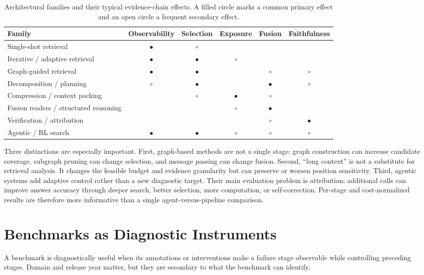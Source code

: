 \documentclass[manuscript,review]{acmart}
\theoremstyle{definition}
\theoremstyle{plain}
\theoremstyle{remark}
\begin{document}
\begin{table}[H]
\caption{Architectural families and their typical evidence-chain effects. A
filled circle marks a common primary effect and an open circle a frequent
secondary effect.}
\label{tab:architecture_estimand}
\centering
\small
\begin{tabularx}{\linewidth}{@{}p{2.7cm}CCCCC@{}}
\toprule
Family & Observability & Selection & Exposure & Fusion & Faithfulness \\
\midrule
Single-shot retrieval & $\bullet$ & $\circ$ &  &  &  \\
Iterative / adaptive retrieval & $\bullet$ & $\bullet$ & $\circ$ &  &  \\
Graph-guided retrieval & $\bullet$ & $\bullet$ &  & $\circ$ & $\circ$ \\
Decomposition / planning & $\circ$ & $\bullet$ &  & $\bullet$ & $\circ$ \\
Compression / context packing &  & $\circ$ & $\bullet$ & $\circ$ &  \\
Fusion readers / structured reasoning &  &  & $\circ$ & $\bullet$ &  \\
Verification / attribution &  &  &  & $\circ$ & $\bullet$ \\
Agentic / RL search & $\bullet$ & $\bullet$ & $\circ$ & $\circ$ & $\circ$ \\
\bottomrule
\end{tabularx}
\end{table}

Three distinctions are especially important. First, graph-based methods are
not a single stage: graph construction can increase candidate coverage,
subgraph pruning can change selection, and message passing can change fusion.
Second, ``long context'' is not a substitute for retrieval analysis. It
changes the feasible budget and evidence granularity but can preserve or
worsen position sensitivity. Third, agentic systems add adaptive control
rather than a new diagnostic target. Their main evaluation problem is
attribution: additional calls can improve answer accuracy through deeper
search, better selection, more computation, or self-correction. Per-stage
and cost-normalized results are therefore more informative than a single
agent-versus-pipeline comparison.
\section{Benchmarks as Diagnostic Instruments}
\label{sec:benchmarks}

A benchmark is diagnostically useful when its annotations or interventions
make a failure stage observable while controlling preceding stages. Domain
and release year matter, but they are secondary to what the benchmark can
identify.
\end{document}
